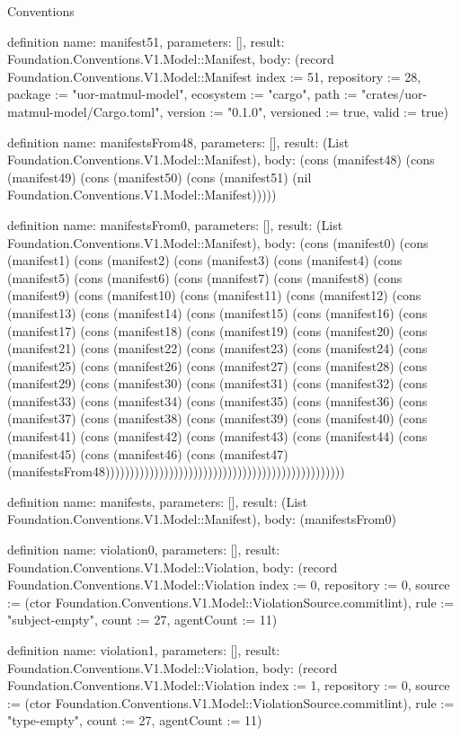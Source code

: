 \begin{lexlean}{Conventions}
\begin{semanticmodule}
definition{
  name: manifest51,
  parameters: [],
  result: Foundation.Conventions.V1.Model::Manifest,
  body: (record Foundation.Conventions.V1.Model::Manifest {index := 51, repository := 28, package := "uor-matmul-model", ecosystem := "cargo", path := "crates/uor-matmul-model/Cargo.toml", version := "0.1.0", versioned := true, valid := true})
}

definition{
  name: manifestsFrom48,
  parameters: [],
  result: (List Foundation.Conventions.V1.Model::Manifest),
  body: (cons (manifest48) (cons (manifest49) (cons (manifest50) (cons (manifest51) (nil Foundation.Conventions.V1.Model::Manifest)))))
}

definition{
  name: manifestsFrom0,
  parameters: [],
  result: (List Foundation.Conventions.V1.Model::Manifest),
  body: (cons (manifest0) (cons (manifest1) (cons (manifest2) (cons (manifest3) (cons (manifest4) (cons (manifest5) (cons (manifest6) (cons (manifest7) (cons (manifest8) (cons (manifest9) (cons (manifest10) (cons (manifest11) (cons (manifest12) (cons (manifest13) (cons (manifest14) (cons (manifest15) (cons (manifest16) (cons (manifest17) (cons (manifest18) (cons (manifest19) (cons (manifest20) (cons (manifest21) (cons (manifest22) (cons (manifest23) (cons (manifest24) (cons (manifest25) (cons (manifest26) (cons (manifest27) (cons (manifest28) (cons (manifest29) (cons (manifest30) (cons (manifest31) (cons (manifest32) (cons (manifest33) (cons (manifest34) (cons (manifest35) (cons (manifest36) (cons (manifest37) (cons (manifest38) (cons (manifest39) (cons (manifest40) (cons (manifest41) (cons (manifest42) (cons (manifest43) (cons (manifest44) (cons (manifest45) (cons (manifest46) (cons (manifest47) (manifestsFrom48)))))))))))))))))))))))))))))))))))))))))))))))))
}

definition{
  name: manifests,
  parameters: [],
  result: (List Foundation.Conventions.V1.Model::Manifest),
  body: (manifestsFrom0)
}

definition{
  name: violation0,
  parameters: [],
  result: Foundation.Conventions.V1.Model::Violation,
  body: (record Foundation.Conventions.V1.Model::Violation {index := 0, repository := 0, source := (ctor Foundation.Conventions.V1.Model::ViolationSource.commitlint), rule := "subject-empty", count := 27, agentCount := 11})
}

definition{
  name: violation1,
  parameters: [],
  result: Foundation.Conventions.V1.Model::Violation,
  body: (record Foundation.Conventions.V1.Model::Violation {index := 1, repository := 0, source := (ctor Foundation.Conventions.V1.Model::ViolationSource.commitlint), rule := "type-empty", count := 27, agentCount := 11})
}


\end{semanticmodule}
\end{lexlean}
